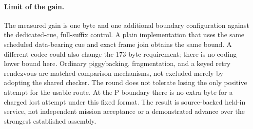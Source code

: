 \documentclass{article}
\begin{document}
\paragraph{Limit of the gain.}
The measured gain is one byte and one additional boundary configuration
against the dedicated-cue, full-suffix control. A plain implementation
that uses the same scheduled data-bearing cue and exact frame join
obtains the same bound. A different codec could also change the
173-byte requirement; there is no coding lower bound here. Ordinary
piggybacking, fragmentation, and a keyed retry rendezvous are matched
comparison mechanisms, not excluded merely by adopting the shared
checker. The round does not tolerate losing the only positive attempt
for the usable route. At the P boundary there is no extra byte for a
charged lost attempt under this fixed format. The result is source-backed
held-in service, not independent mission acceptance or a demonstrated
advance over the strongest established assembly.
\end{document}
